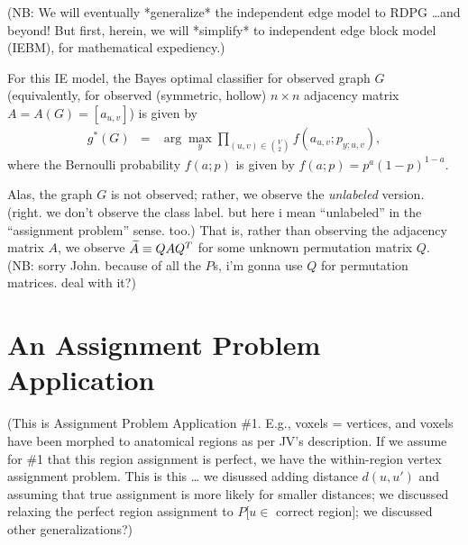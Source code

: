 (NB: We will eventually *generalize* the independent edge model to RDPG \ldots and beyond!
But first, herein, we will *simplify* to independent edge block model (IEBM), for mathematical expediency.)

For this IE model, the Bayes optimal classifier for observed graph $G$
(equivalently, for observed (symmetric, hollow) $n \times n$ adjacency matrix $A=A(G)=[a_{u,v}]$)
is given by
\begin{eqnarray}
g^*(G) &=& \arg\max_y \prod_{(u,v) \in {V \choose 2}} f(a_{u,v};p_{y;u,v}),
\end{eqnarray}
where the Bernoulli probability $f(a;p)$ is given by
$f(a;p) = p^{a} (1-p)^{1-a}$.

Alas, the graph $G$ is not observed;
rather, we observe the {\em unlabeled} version.
(right. we don't observe the class label.
but here i mean ``unlabeled'' in the ``assignment problem'' sense.
too.)
That is, rather than observing the adjacency matrix $A$,
we observe $\widetilde{A} \equiv QAQ^T$ for some unknown permutation matrix $Q$.
\\
(NB: sorry John.  because of all the $P$s, i'm gonna use $Q$ for permutation matrices.  deal with it?)




\section{An Assignment Problem Application}


(This is Assignment Problem Application \#1.
E.g., voxels = vertices,
and voxels have been morphed to anatomical regions as per JV's description.
If we assume for \#1 that this region assignment is perfect,
we have the within-region vertex assignment problem.
This is this \dots
we disussed adding distance $d(u,u')$ and assuming that true assignment is more likely for smaller distances;
we discussed relaxing the perfect region assignment to $P[u \in$ correct region$]$;
we discussed other generalizations?)



%
%

